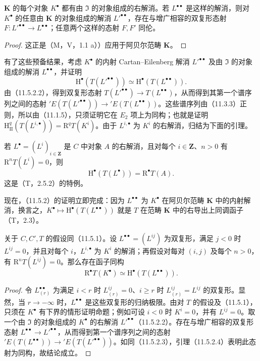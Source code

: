 $\mathbf K$ 的每个对象 $K^\bullet$ 都有由 $\mathfrak I$ 的对象组成的右解消。若 $L^{\bullet\bullet}$ 是这样的解消，则对 $K^\bullet$ 的任意由 $\mathbf K$ 的对象组成的解消 $L'^{\bullet\bullet}$，存在与增广相容的双复形态射 $F:L'^{\bullet\bullet}\to L^{\bullet\bullet}$；任意两个这样的态射 $F,F'$ 同伦。
\begin{proof}
这正是（M，V，1.1 a））应用于阿贝尔范畴 $\mathbf K$。
\end{proof}

有了这些预备结果，考虑 $K^\bullet$ 的内射 Cartan--Eilenberg 解消 $L'^{\bullet\bullet}$ 及由 $\mathfrak I$ 的对象组成的解消 $L^{\bullet\bullet}$，并证明
\[
\mathrm H^\bullet(T(L'^{\bullet\bullet}))\simeq\mathrm H^\bullet(T(L^{\bullet\bullet})).
\]
由（11.5.2.2），得到双复形态射 $T(L'^{\bullet\bullet})\to T(L^{\bullet\bullet})$，从而得到其第一个谱序列之间的态射 $'E(T(L'^{\bullet\bullet}))\to'E(T(L^{\bullet\bullet}))$。这些谱序列由（11.3.3）正则，所以由（11.1.5），只须证明它在 $E_2$ 项上为同构；也就是证明 $\mathrm H_{\mathrm{II}}^q(T(L^{i,\bullet}))=\mathrm R^qT(K^i)$。由于 $L^{i,\bullet}$ 为 $K^i$ 的右解消，归结为下面的引理。

若 $L^\bullet=(L^i)_{i\in\mathbf Z}$ 是 $C$ 中对象 $A$ 的右解消，且对每个 $i\in\mathbf Z$、$n>0$ 有 $\mathrm R^nT(L^i)=0$，则
\[
\mathrm H^\bullet(T(L^\bullet))=\mathrm R^\bullet T(A).
\]
这是（T，2.5.2）的特例。

现在，（11.5.2）的证明立即完成：因为 $L^{\bullet\bullet}$ 为 $K^\bullet$ 在阿贝尔范畴 $\mathbf K$ 中的内射解消，换言之，$K^\bullet\mapsto\mathrm H^\bullet(T(L^{\bullet\bullet}))$ 就是 $T$ 在范畴 $\mathbf K$ 中的右导出上同调函子（T，2.3）。\finishproof

关于 $C,C',T$ 的假设同（11.5.1）。设 $L^{\bullet\bullet}=(L^{ij})$ 为双复形，满足 $j<0$ 时 $L^{ij}=0$，并且对每个 $i$，$L^{i,\bullet}$ 为 $K^i$ 的解消；再假设对每对 $(i,j)$ 及每个 $n>0$，有 $\mathrm R^nT(L^{ij})=0$。那么存在函子同构
\begin{equation}\tag{11.5.3.1}
\mathrm R^\bullet T(K^\bullet)\simeq\mathrm H^\bullet(T(L^{\bullet\bullet})).
\end{equation}
\begin{proof}
令 $L_{(r)}^{\bullet\bullet}$ 为满足 $i<r$ 时 $L_{(r)}^{ij}=0$、$i\geq r$ 时 $L_{(r)}^{ij}=L^{ij}$ 的双复形。显然，当 $r\to-\infty$ 时，$L^{\bullet\bullet}$ 是这些双复形的归纳极限。由对 $T$ 的假设及（11.5.1），只须在 $K^\bullet$ 有下界的情形证明命题；例如可设 $i<0$ 时 $K^i=0$，并有 $L^{ij}=0$。取一个由 $\mathfrak I$ 的对象组成的 $K^\bullet$ 的右解消 $L'^{\bullet\bullet}$（11.5.2.2）。存在与增广相容的双复形态射 $L^{\bullet\bullet}\to L'^{\bullet\bullet}$，从而得到第一个谱序列之间的态射 $'E(T(L^{\bullet\bullet}))\to'E(T(L'^{\bullet\bullet}))$。如同（11.5.2.3），引理（11.5.2.4）表明此态射为同构，故结论成立。
\end{proof}

